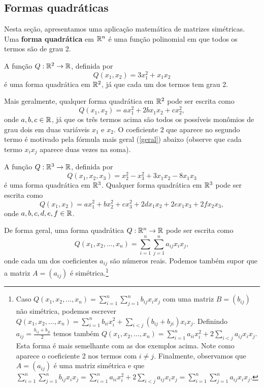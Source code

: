 \documentclass[../livro.tex]{subfiles}
\begin{document}
\subsection{Formas quadráticas}


Nesta seção, apresentamos uma aplicação matemática de matrizes simétricas. Uma \textbf{forma quadrática} em $\mathbb{R}^n$ é uma função polinomial em que todos os termos são de grau 2.

\begin{example}\label{exemplo1}
	A função $Q : \mathbb{R}^2 \to \mathbb{R}$, definida por 
	\[
	Q(x_1, x_2) = 3 x_1^2 + x_1x_2
	\] é uma forma quadrática em $\mathbb{R}^2$, já que cada um dos termos tem grau 2.
	
	Mais geralmente, qualquer forma quadrática em $\mathbb{R}^2$ pode ser escrita como
	\[
	Q(x_1, x_2) = a x_1^2 + 2 b x_1x_2 + cx_2^2,
	\] onde $a,b,c \in \mathbb{R}$, já que os três termos acima são todos os possíveis monômios de grau dois em duas variáveis $x_1$ e $x_2$. O coeficiente $2$ que aparece no segundo termo é motivado pela fórmula mais geral (\ref{geral}) abaixo (observe que cada termo $x_i x_j$ aparece duas vezes na soma).
\end{example}




\begin{example}\label{exemplo2}
	A função $Q : \mathbb{R}^3 \to \mathbb{R}$, definida por 
	\[
	Q(x_1, x_2, x_3) = x_2^2 - x_3^2 + 3 x_1 x_2 - 8 x_1 x_3
	\] é uma forma quadrática em $\mathbb{R}^3$. Qualquer forma quadrática em $\mathbb{R}^3$ pode ser escrita como
	\[
	Q(x_1, x_2) = a x_1^2 + b x_2^2 + cx_3^2 + 2 dx_1x_2 +2  ex_1x_3 +2  fx_2x_3,
	\] onde $a,b,c, d, e, f \in \mathbb{R}$.
\end{example}


De forma geral, uma forma quadrática $Q :\mathbb{R}^n \to \mathbb{R}$ pode ser escrita como
\begin{equation}\label{geral}
Q(x_1, x_2, \dots, x_n) = \sum_{i=1}^{n} \sum_{j=1}^{n} a_{ij} x_i x_j,
\end{equation} onde cada um dos coeficientes $a_{ij}$ são números reais. Podemos também supor que a matriz $A = (a_{ij})$ é simétrica.\footnote{Caso  $Q(x_1, x_2, \dots, x_n) = \sum_{i=1}^{n} \sum_{j=1}^{n} b_{ij} x_i x_j$ com uma matriz $B = (b_{ij})$  não  simétrica, podemos escrever $Q(x_1, x_2, \dots, x_n) = \sum_{i=1}^{n} b_{ii} x_i^2 + \sum_{i < j} (b_{ij} + b_{ji}) x_i x_j$. Definindo $a_{ij} = \frac{b_{ij} + b_{ji}}{2}$ temos também $Q(x_1, x_2, \dots, x_n) = \sum_{i=1}^{n} a_{ii} x_i^2 + 2 \sum_{i < j} a_{ij} x_i x_j$. Esta forma é mais semelhante com as dos exemplos acima. Note como aparece o coeficiente 2 nos termos com $i \neq j$. Finalmente, observamos que $A = (a_{ij})$ é uma matriz simétrica e que $\sum_{i=1}^{n} \sum_{j=1}^{n} b_{ij} x_i x_j = \sum_{i=1}^{n} a_{ii} x_i^2 + 2 \sum_{i < j} a_{ij} x_i x_j = \sum_{i=1}^{n} \sum_{j=1}^{n} a_{ij} x_i x_j.$}
\end{document}
